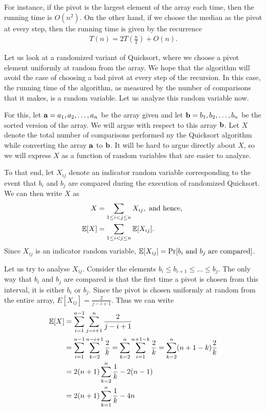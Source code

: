 For instance, if the pivot is the largest element of the array each time, then the running time is $O(n^2)$. On the other hand, if we choose the median as the pivot at every step, then the running time is given by the recurrence
\begin{align*}
	T(n) = 2T\left( \frac{n}{2} \right) + O(n).
\end{align*}

Let us look at a randomized variant of Quicksort, where we choose a pivot element uniformly at random from the array. We hope that the algorithm will avoid the case of choosing a bad pivot at every step of the recursion. In this case, the running time of the algorithm, as measured by the number of comparisons that it makes, is a random variable. Let us analyze this random variable now.

For this, let $\mathbf{a} = a_1, a_2, \ldots, a_n$ be the array given and let $\mathbf{b} = b_1, b_2, \ldots, b_n$ be the sorted version of the array. We will argue with respect to this array $\mathbf{b}$. Let $X$ denote the total number of comparisons performed ny the Quicksort algorithm while converting the array $\mathbf{a}$ to $\mathbf{b}$. It will be hard to argue directly about $X$, so we will express $X$ as a function of random variables that are easier to analyze. 

To that end, let $X_{ij}$ denote an indicator random variable corresponding to the event that $b_i$ and $b_j$ are compared during the execution of randomized Quicksort. We can then write $X$ as
\begin{align*}
	X &= \sum_{1\leq i<j\leq n} X_{ij}, \text{ and hence, }\\
	\mathbb{E}[X] &= \sum_{1\leq i<j\leq n} \mathbb{E}[X_{ij}].
\end{align*} 
Since $X_{ij}$ is an indicator random variable, $\mathbb{E}[X_{ij}] = \Pr[\text{$b_i$ and $b_j$ are compared}]$. 

Let us try to analyse $X_{ij}$. Consider the elements $b_i \leq b_{i+1} \leq \ldots \leq b_j$. The only way that $b_i$ and $b_j$ are compared is that the first time a pivot is chosen from this interval, it is either $b_i$ or $b_j$. Since the pivot is chosen uniformly at random from the entire array, $E[X_{ij}] = \tfrac{2}{j-i+1}$. Thus we can write
\begin{align*}
	\mathbb{E}[X] &= \sum_{i=1}^{n-1} \sum_{j=i+1}^n \frac{2}{j-i+1}\\
	&= \sum_{i=1}^{n-1} \sum_{k=2}^{n-i+1}\frac{2}{k} = \sum_{k=2}^n \sum_{i=1}^{n+1-k} \frac{2}{k} = \sum_{k=2}^n (n+1-k)\frac{2}{k}\\
	&= 2(n+1)\sum_{k=2}^n \frac{1}{k} - 2(n-1)\\
	&= 2(n+1)\sum_{k=1}^n \frac{1}{k} - 4n
\end{align*}

